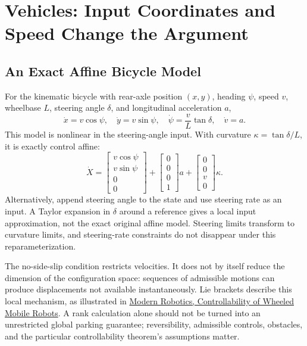 \section{Vehicles: Input Coordinates and Speed Change the Argument}

\subsection{An Exact Affine Bicycle Model}

For the kinematic bicycle with rear-axle position $(x,y)$, heading $\psi$, speed $v$, wheelbase $L$, steering angle $\delta$, and longitudinal acceleration $a$,
\begin{equation}
 \dot x=v\cos\psi,\quad \dot y=v\sin\psi,\quad
 \dot\psi=\frac{v}{L}\tan\delta,\quad \dot v=a.
\end{equation}
This model is nonlinear in the steering-angle input. With curvature $\kappa=\tan\delta/L$, it is exactly control affine:
\begin{equation}
 \dot X=\begin{bmatrix}v\cos\psi\\v\sin\psi\\0\\0\end{bmatrix}
 +\begin{bmatrix}0\\0\\0\\1\end{bmatrix}a
 +\begin{bmatrix}0\\0\\v\\0\end{bmatrix}\kappa.
\end{equation}
Alternatively, append steering angle to the state and use steering rate as an input. A Taylor expansion in $\delta$ around a reference gives a local input approximation, not the exact original affine model. Steering limits transform to curvature limits, and steering-rate constraints do not disappear under this reparameterization.

The no-side-slip condition restricts velocities. It does not by itself reduce the dimension of the configuration space: sequences of admissible motions can produce displacements not available instantaneously. Lie brackets describe this local mechanism, as illustrated in \href{https://modernrobotics.northwestern.edu/nu-gm-book-resource/13-3-2-controllability-of-wheeled-mobile-robots-part-3-of-4/}{Modern Robotics, Controllability of Wheeled Mobile Robots}. A rank calculation alone should not be turned into an unrestricted global parking guarantee; reversibility, admissible controls, obstacles, and the particular controllability theorem's assumptions matter.


